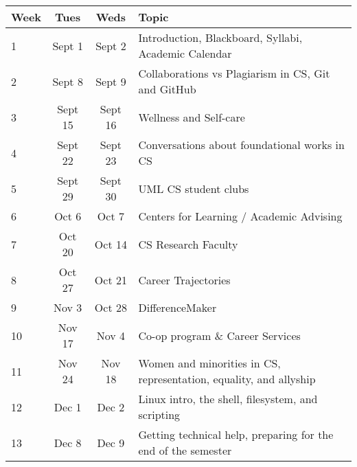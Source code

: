 \begin{center}
\begin{tabular}{|l|c|c|l|}\hline
Week & Tues & Weds & Topic \\ \hline
1 & Sept 1 & Sept 2 & Introduction, Blackboard, Syllabi, Academic Calendar\\ \hline
2 & Sept 8 & Sept 9 & Collaborations vs Plagiarism in CS, Git and GitHub\\ \hline
3 & Sept 15 & Sept 16 & Wellness and Self-care\\ \hline
4 & Sept 22 & Sept 23 & Conversations about foundational works in CS\\ \hline
5 & Sept 29 & Sept 30 & UML CS student clubs\\ \hline
6 & Oct 6 & Oct 7 & Centers for Learning / Academic Advising\\ \hline
7 & Oct 20 & Oct 14 & CS Research Faculty\\ \hline
8 & Oct 27 & Oct 21 & Career Trajectories\\ \hline
9 & Nov 3 & Oct 28 & DifferenceMaker\\ \hline
10 & Nov 17 & Nov 4 & Co-op program \& Career Services\\ \hline
11 & Nov 24 & Nov 18 & Women and minorities in CS, representation, equality, and allyship\\ \hline
12 & Dec 1 & Dec 2 & Linux intro, the shell, filesystem, and scripting\\ \hline
13 & Dec 8 & Dec 9 & Getting technical help, preparing for the end of the semester\\ \hline
\end{tabular}
\end{center}

